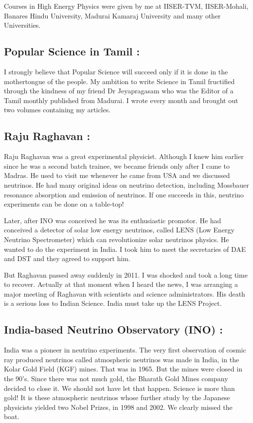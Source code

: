 Courses in High Energy Physics were given by me at IISER-TVM, 
IISER-Mohali, Banares Hindu University, Madurai Kamaraj University and 
many other Universities.

\subsection*{Popular Science in Tamil :}

I strongly believe that Popular Science will succeed only if it is done 
in the mothertongue of the people. My ambition to write Science in Tamil 
fructified through the kindness of my friend Dr Jeyapragasam who was the 
Editor of a Tamil monthly published from Madurai. I wrote every month 
and brought out two volumes containing my articles.

\subsection*{Raju Raghavan :}

Raju Raghavan was a great experimental physicist. Although I knew him 
earlier since he was a second batch trainee, we became friends only 
after I came to Madras. He used to visit me whenever he came from USA 
and we discussed neutrinos. He had many original ideas on neutrino 
detection, including Mossbauer resonance absorption and emission of 
neutrinos. If one succeeds in this, neutrino experiments can be done on 
a table-top!
\smallskip

Later, after INO was conceived he was its enthusiastic promotor. He had 
conceived a detector of solar low energy neutrinos, called LENS (Low 
Energy Neutrino Spectrometer) which can revolutionize solar neutrinos 
physics. He wanted to do the experiment in India. I took him to meet the 
secretaries of DAE and DST and they agreed to support him.
\smallskip

But Raghavan passed away suddenly in 2011. I was shocked and took a long 
time to recover. Actually at that moment when I heard the news, I was 
arranging a major meeting of Raghavan with scientists and science 
administrators. His death is a serious loss to Indian Science. India 
must take up the LENS Project.

\subsection*{India-based Neutrino Observatory (INO) :}

India was a pioneer in neutrino experiments. The very first observation 
of cosmic ray produced neutrinos called atmospheric neutrinos was made 
in India, in the Kolar Gold Field (KGF) mines. That was in 1965. But the 
mines were closed in the 90's. Since there was not much gold, the 
Bharath Gold Mines company decided to close it. We should not have let 
that happen. Science is more than gold! It is these atmospheric 
neutrinos whose further study by the Japanese physicists yielded two 
Nobel Prizes, in 1998 and 2002. We clearly missed the boat.

